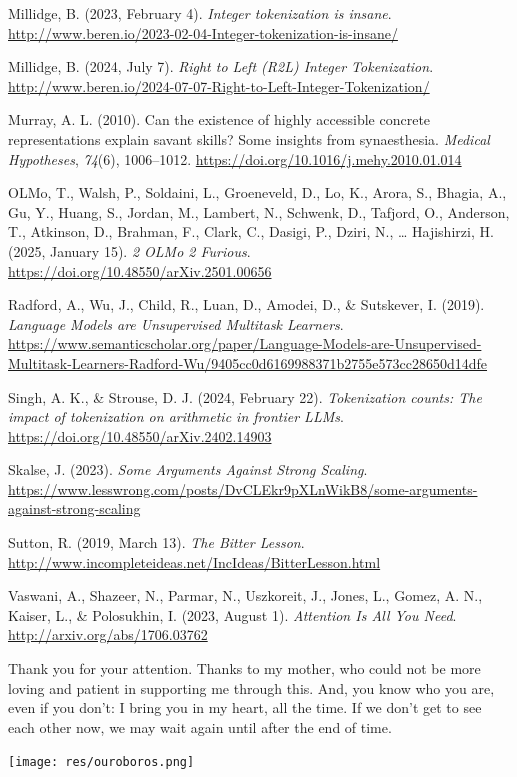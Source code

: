 \documentclass[
  a4paper, twoside, 10pt, titlepage]{book}
\newlength{\cslhangindent}
\newenvironment{CSLReferences}[2] %
 {\begin{list}{}{%
  \setlength{\itemindent}{0pt}
  \setlength{\leftmargin}{0pt}
  \setlength{\parsep}{0pt}
  \ifodd #1
   \setlength{\leftmargin}{\cslhangindent}
   \setlength{\itemindent}{-1\cslhangindent}
  \fi
  \setlength{\itemsep}{#2\baselineskip}}}
 {\end{list}}
\begin{document}
\begin{CSLReferences}{1}{0}
Millidge, B. (2023, February 4). \emph{Integer tokenization is insane}.
\url{http://www.beren.io/2023-02-04-Integer-tokenization-is-insane/}

Millidge, B. (2024, July 7). \emph{Right to {Left} ({R2L}) {Integer
Tokenization}}.
\url{http://www.beren.io/2024-07-07-Right-to-Left-Integer-Tokenization/}

Murray, A. L. (2010). Can the existence of highly accessible concrete
representations explain savant skills? {Some} insights from
synaesthesia. \emph{Medical Hypotheses}, \emph{74}(6), 1006--1012.
\url{https://doi.org/10.1016/j.mehy.2010.01.014}

OLMo, T., Walsh, P., Soldaini, L., Groeneveld, D., Lo, K., Arora, S.,
Bhagia, A., Gu, Y., Huang, S., Jordan, M., Lambert, N., Schwenk, D.,
Tafjord, O., Anderson, T., Atkinson, D., Brahman, F., Clark, C., Dasigi,
P., Dziri, N., \ldots{} Hajishirzi, H. (2025, January 15). \emph{2
{OLMo} 2 {Furious}}. \url{https://doi.org/10.48550/arXiv.2501.00656}

Radford, A., Wu, J., Child, R., Luan, D., Amodei, D., \& Sutskever, I.
(2019). \emph{Language {Models} are {Unsupervised Multitask Learners}}.
\url{https://www.semanticscholar.org/paper/Language-Models-are-Unsupervised-Multitask-Learners-Radford-Wu/9405cc0d6169988371b2755e573cc28650d14dfe}

Singh, A. K., \& Strouse, D. J. (2024, February 22). \emph{Tokenization
counts: The impact of tokenization on arithmetic in frontier {LLMs}}.
\url{https://doi.org/10.48550/arXiv.2402.14903}

Skalse, J. (2023). \emph{Some {Arguments Against Strong Scaling}}.
\url{https://www.lesswrong.com/posts/DvCLEkr9pXLnWikB8/some-arguments-against-strong-scaling}

Sutton, R. (2019, March 13). \emph{The {Bitter Lesson}}.
\url{http://www.incompleteideas.net/IncIdeas/BitterLesson.html}

Vaswani, A., Shazeer, N., Parmar, N., Uszkoreit, J., Jones, L., Gomez,
A. N., Kaiser, L., \& Polosukhin, I. (2023, August 1). \emph{Attention
{Is All You Need}}. \url{http://arxiv.org/abs/1706.03762}

\end{CSLReferences}

\listoffigures

\clearpage

Thank you for your attention. Thanks to my mother, who could not be more
loving and patient in supporting me through this. And, you know who you
are, even if you don't: I bring you in my heart, all the time. If we
don't get to see each other now, we may wait again until after the end
of time.

\texttt{[image: res/ouroboros.png]}

\backmatter
\end{document}
